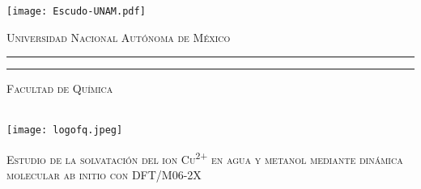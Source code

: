 
\begin{titlepage}
    \thispagestyle{empty}
    \begin{minipage}[c][0.17\textheight][c]{0.23\textwidth}
        \begin{center}
            \texttt{[image: Escudo-UNAM.pdf]}
        \end{center}
    \end{minipage}
    \begin{minipage}[c][0.195\textheight][t]{0.725\textwidth}
        \begin{center}
            \vspace{0.3cm}
            \textsc{\large Universidad Nacional Aut\'onoma de M\'exico}\\[0.5cm]
            \vspace{0.3cm}
            \hrule height2.5pt
            \vspace{.2cm}
            \hrule height1pt
            \vspace{.8cm}
            \textsc{Facultad de Química}\\[0.5cm] %
        \end{center}
    \end{minipage}

    \begin{minipage}[c][0.81\textheight][t]{0.20\textwidth}
        \vspace*{5mm}
        \begin{center}
            \hskip2.0mm
            \vrule width1pt height13cm 
            \vspace{5mm}
            \hskip2pt
            \vrule width2.5pt height13cm
            \hskip2mm
            \vrule width1pt height13cm \\
            \vspace{5mm}
            \texttt{[image: logofq.jpeg]}
        \end{center}
    \end{minipage}
    \begin{minipage}[c][0.81\textheight][t]{0.75\textwidth}
        \begin{center}
            \vspace{1cm}

            {\large\scshape Estudio de la solvatación del ion Cu\textsuperscript{2+} en agua y metanol mediante dinámica molecular ab initio con DFT/M06-2X}\\[.2in]

            \vspace{2cm}            


\end{center}
\end{minipage}
\end{titlepage}
